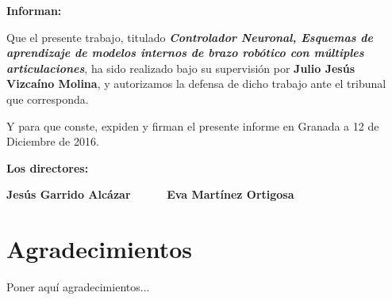 \vspace{0.5cm}

\textbf{Informan:}

\vspace{0.5cm}

Que el presente trabajo, titulado \textit{\textbf{Controlador Neuronal, Esquemas de aprendizaje de modelos internos de brazo robótico con múltiples articulaciones}}, ha sido realizado bajo su supervisión por \textbf{Julio Jesús Vizcaíno Molina}, y autorizamos la defensa de dicho trabajo ante el tribunal que corresponda.

\vspace{0.5cm}

Y para que conste, expiden y firman el presente informe en Granada a 12 de Diciembre de 2016.

\vspace{1cm}

\textbf{Los directores:}

\vspace{5cm}

\noindent \textbf{Jesús Garrido Alcázar \ \ \ \ \ Eva Martínez Ortigosa}

\chapter*{Agradecimientos}
\thispagestyle{empty}

       \vspace{1cm}


Poner aquí agradecimientos...

